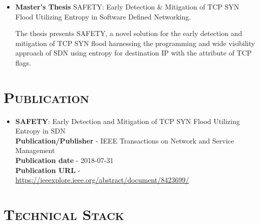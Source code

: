 \documentclass{moderncv}
\begin{document}
\begin{itemize}
\vspace{3pt}


\item{\textbf{Master's Thesis} SAFETY: Early Detection \& Mitigation of TCP
SYN Flood Utilizing Entropy in Software Defined Networking.

\vspace{3pt}

\small{The thesis presents SAFETY, a novel solution for the early detection and mitigation of TCP SYN flood harnessing the programming and wide visibility approach of SDN using entropy for destination IP with the attribute of TCP flags.}}

\vspace{4pt}

\end{itemize}

\vspace{2pt}

\section{\textsc{Publication}}

\vspace{2pt}

\begin{itemize}
\item{\textbf{SAFETY}: Early Detection and Mitigation of TCP SYN Flood Utilizing Entropy in SDN}\\
\textbf{Publication/Publisher} - IEEE Transactions on Network and Service Management \\
\textbf{Publication date} - 2018-07-31 \\
\textbf{Publication URL} - \url{https://ieeexplore.ieee.org/abstract/document/8423699/}
\end{itemize}

\section{\textsc{Technical Stack}}

\vspace{2pt}
\end{document}
